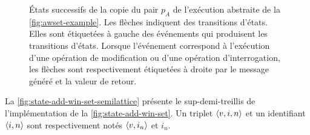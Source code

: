\begin{figure}[bth]
\centering
{}
\caption{États successifs de la copie du pair $p_A$ de l'exécution abstraite de la \autoref{fig:awset-example}.
Les flèches indiquent des transitions d'états.
Elles sont étiquetées à gauche des événements qui produisent les transitions d'états.
Lorsque l'événement correspond à l'exécution d'une opération de modification ou d'une opération d'interrogation, les flèches sont respectivement étiquetées à droite par le message généré et la valeur de retour.}\label{fig:state-awset-state-trans}
\end{figure}

La \autoref{fig:state-add-win-set-semilattice} présente le sup-demi-treillis de l'implémentation de la \autoref{fig:state-add-win-set}.
Un triplet $\tuple*{v, i, n}$ et un identifiant $\tuple*{i, n}$ sont respectivement notés $\tuple*{v, i_n}$ et $i_n$.

